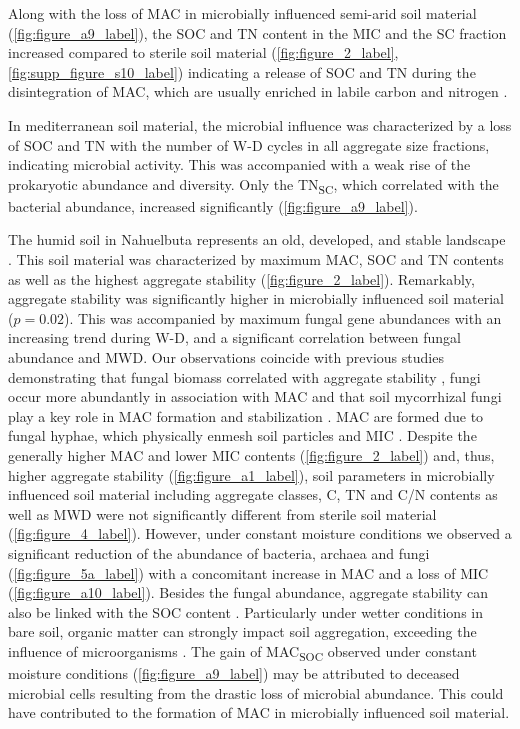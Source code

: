 Along with the loss of MAC in microbially influenced semi-arid soil material (\cref{fig:figure_a9_label}), the SOC and TN content in the MIC and the SC fraction increased compared to sterile soil material (\cref{fig:figure_2_label}, \cref{fig:supp_figure_s10_label}) indicating a release of SOC and TN during the disintegration of MAC, which are usually enriched in labile carbon and nitrogen \citep{Marx2005}.

In mediterranean soil material, the microbial influence was characterized by a loss of SOC and TN with the number of W-D cycles in all aggregate size fractions, indicating microbial activity. 
This was accompanied with a weak rise of the prokaryotic abundance and diversity. 
Only the TN\textsubscript{SC}, which correlated with the bacterial abundance, increased significantly (\cref{fig:figure_a9_label}).

The humid soil in Nahuelbuta represents an old, developed, and stable landscape \citep{Mucina2011}. 
This soil material was characterized by maximum MAC, SOC and TN contents as well as the highest aggregate stability (\cref{fig:figure_2_label}). 
Remarkably, aggregate stability was significantly higher in microbially influenced soil material (\(p = 0.02\)). 
This was accompanied by maximum fungal gene abundances with an increasing trend during W-D, and a significant correlation between fungal abundance and MWD. 
Our observations coincide with previous studies demonstrating that fungal biomass correlated with aggregate stability \citep{Cosentino2006}, fungi occur more abundantly in association with MAC \citep{Kihara2012} and that soil mycorrhizal fungi play a key role in MAC formation and stabilization \citep{Chotte2005}. 
MAC are formed due to fungal hyphae, which physically enmesh soil particles and MIC \citep{Davinic2012}. 
Despite the generally higher MAC and lower MIC contents (\cref{fig:figure_2_label}) and, thus, higher aggregate stability (\cref{fig:figure_a1_label}), soil parameters in microbially influenced soil material including aggregate classes, C, TN and C/N contents as well as MWD were not significantly different from sterile soil material (\cref{fig:figure_4_label}). 
However, under constant moisture conditions we observed a significant reduction of the abundance of bacteria, archaea and fungi (\cref{fig:figure_5a_label}) with a concomitant increase in MAC and a loss of MIC (\cref{fig:figure_a10_label}). 
Besides the fungal abundance, aggregate stability can also be linked with the SOC content \citep{AlKaisi2014}. 
Particularly under wetter conditions in bare soil, organic matter can strongly impact soil aggregation, exceeding the influence of microorganisms \citep{RiverasMunoz2022}. 
The gain of MAC\textsubscript{SOC} observed under constant moisture conditions (\cref{fig:figure_a9_label}) may be attributed to deceased microbial cells resulting from the drastic loss of microbial abundance. 
This could have contributed to the formation of MAC in microbially influenced soil material.

